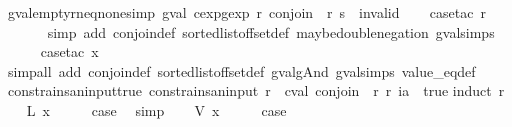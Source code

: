 \begin{isabellebody}
\ gval{\isacharunderscore}empty{\isacharunderscore}r{\isacharunderscore}neq{\isacharunderscore}none{\isacharbrackleft}simp{\isacharbrackright}{\isacharcolon}\ {\isachardoublequoteopen}gval\ {\isacharparenleft}cexp{}gexp\ r\ {\isacharparenleft}conjoin\ {\isacharparenleft}{\isasymlbrakk}{\isasymrbrakk}\ r{\isacharparenright}{\isacharparenright}{\isacharparenright}\ s\ {\isasymnoteq}\ invalid{\isachardoublequoteclose}\isanewline
%
\isadelimproof
\ \ %
\endisadelimproof
%
\isatagproof
{}\isamarkupfalse%
\ {\isacharparenleft}case{\isacharunderscore}tac\ r{\isacharparenright}\isanewline
\ \ \ \ \ \isamarkupfalse%
\ {\isacharparenleft}simp\ add{\isacharcolon}\ conjoin{\isacharunderscore}def\ sorted{\isacharunderscore}list{\isacharunderscore}of{\isacharunderscore}fset{\isacharunderscore}def\ maybe{\isacharunderscore}double{\isacharunderscore}negation\ gval{\isachardot}simps{\isacharparenright}\isanewline
\ \ \ \ \isamarkupfalse%
\ {\isacharparenleft}case{\isacharunderscore}tac\ x{}{\isacharparenright}\isanewline
\ \ \isamarkupfalse%
\ {\isacharparenleft}simp{\isacharunderscore}all\ add{\isacharcolon}\ conjoin{\isacharunderscore}def\ sorted{\isacharunderscore}list{\isacharunderscore}of{\isacharunderscore}fset{\isacharunderscore}def\ gval{\isacharunderscore}gAnd\ gval{\isachardot}simps\ value_eq{\isacharunderscore}def{\isacharparenright}%
\endisatagproof
{\isafoldproof}%
%
\isadelimproof
\isanewline
%
\endisadelimproof
\isanewline
{}\isamarkupfalse%
\ constrains{\isacharunderscore}an{\isacharunderscore}input{\isacharunderscore}true{\isacharcolon}\ {\isachardoublequoteopen}constrains{\isacharunderscore}an{\isacharunderscore}input\ r\ {\isasymLongrightarrow}\ cval\ {\isacharparenleft}conjoin\ {\isacharparenleft}{\isasymlbrakk}{\isasymrbrakk}\ r{\isacharparenright}{\isacharparenright}\ r\ ia\ {\isacharequal}\ true{\isachardoublequoteclose}\isanewline
%
\isadelimproof
%
\endisadelimproof
%
\isatagproof
{}\isamarkupfalse%
{\isacharparenleft}induct\ r{\isacharparenright}\isanewline
\ \ \isamarkupfalse%
\ {\isacharparenleft}L\ x{\isacharparenright}\isanewline
\ \ \isamarkupfalse%
\ \isamarkupfalse%
\ {\isacharquery}case\ \isamarkupfalse%
\ simp\isanewline
{}\isamarkupfalse%
\isanewline
\ \ \isamarkupfalse%
\ {\isacharparenleft}V\ x{\isacharparenright}\isanewline
\ \ \isamarkupfalse%
\ \isamarkupfalse%
\ {\isacharquery}case\isanewline

\end{isabellebody}
